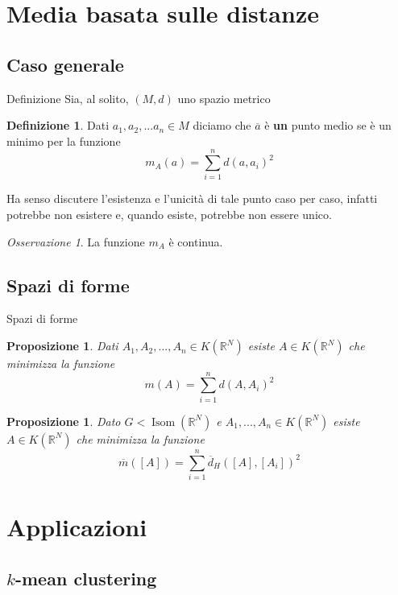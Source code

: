 \documentclass{beamer}
\newcounter{counter1}
\theoremstyle{plain}
\newtheorem{mypro}[counter1]{Proposizione}
\theoremstyle{definition}
\newtheorem{mydef}[counter1]{Definizione}
\theoremstyle{remark}
\newtheorem{myoss}[counter1]{Osservazione}
\newcommand{\obar}[1]{\overline{#1}}
\newcommand{\bra}[1]{\left[#1\right]}
\DeclareMathOperator{\isom}{Isom}
\begin{document}
\section{Media basata sulle distanze}

\subsection{Caso generale}

\begin{frame}{Definizione}
  Sia, al solito, $(M,d)$ uno spazio metrico
  \begin{mydef}
    Dati $a_1,a_2,... a_n \in M$ diciamo che $\obar a$ è \textbf{un}
    punto medio se è un minimo per la funzione
    \[ m_A (a) = \sum _{i = 1} ^n d(a,a_i)^2 \]
  \end{mydef}
  
  Ha senso discutere l'esistenza e l'unicità di tale punto caso per
  caso, infatti potrebbe non esistere e, quando esiste, potrebbe non
  essere unico.

  \begin{myoss}
    La funzione $m_A$ è continua.
  \end{myoss}
\end{frame}

\subsection{Spazi di forme}

\begin{frame}{Spazi di forme}
  \begin{mypro}
    Dati $A_1, A_2,..., A_n \in K(\mathbb{R}^N)$ esiste $A \in
    K(\mathbb{R}^N)$ che minimizza la funzione
    \[ m(A) = \sum _{i =1} ^n d(A,A_i)^2 \]
  \end{mypro}

  \begin{mypro}
    Dato $G < \isom (\mathbb{R}^N)$ e $A_1,...,A_n \in K(\mathbb{R}^N)$
    esiste $A \in K(\mathbb{R}^N)$ che minimizza la funzione 
    \[ \obar m(\bra{A}) = \sum _{i =1} ^n \obar
    d_H(\bra{A},\bra{A_i})^2 \]
  \end{mypro}
\end{frame}


\section{Applicazioni}

\subsection{$k$-mean clustering}
\end{document}
